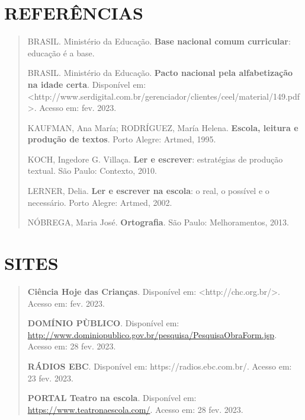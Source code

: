 \section{REFERÊNCIAS}\label{referuxeancias}

\begin{quote}
BRASIL. Ministério da Educação. \textbf{Base nacional comum curricular}:
educação é a base.

BRASIL. Ministério da Educação. \textbf{Pacto nacional pela
alfabetização na idade certa}. Disponível em:
\textless{}http://www.serdigital.com.br/gerenciador/clientes/ceel/material/149.pdf\textgreater{}.
Acesso em: fev. 2023.

KAUFMAN, Ana María; RODRÍGUEZ, María Helena. \textbf{Escola, leitura e
produção de textos}. Porto Alegre: Artmed, 1995.

KOCH, Ingedore G. Villaça. \textbf{Ler e escrever}: estratégias de
produção textual. São Paulo: Contexto, 2010.

LERNER, Delia. \textbf{Ler e escrever na escola}: o real, o possível e o
necessário. Porto Alegre: Artmed, 2002.

NÓBREGA, Maria José. \textbf{Ortografia}. São Paulo: Melhoramentos,
2013.
\end{quote}

\section{SITES}\label{sites}

\begin{quote}
\textbf{Ciência Hoje das Crianças}. Disponível em:
\textless{}http://chc.org.br/\textgreater{}. Acesso em: fev. 2023.

\textbf{DOMÍNIO PÙBLICO}. Disponível em:
\url{http://www.dominiopublico.gov.br/pesquisa/PesquisaObraForm.jsp}.
Acesso em: 28 fev. 2023.

\textbf{RÁDIOS EBC}. Disponível em: https://radios.ebc.com.br/. Acesso
em: 23 fev. 2023.

\textbf{PORTAL Teatro na escola}. Disponível em:
\url{https://www.teatronaescola.com/}. Acesso em: 28 fev. 2023.
\end{quote}
